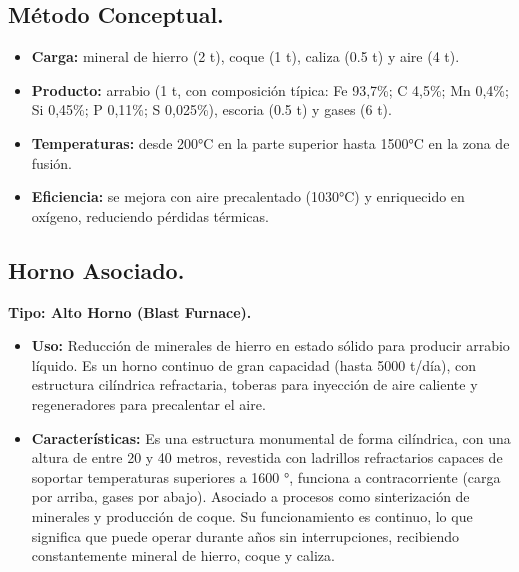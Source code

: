 \documentclass[12pt,a4paper]{article}
\begin{document}
\subsection{Método Conceptual.}

\begin{itemize}
    \item \textbf{Carga:} mineral de hierro (2 t), coque (1 t), caliza (0.5 t) y aire (4 t).
    \item \textbf{Producto:} arrabio (1 t, con composición típica: Fe 93,7\%; C 4,5\%; Mn 0,4\%; Si 0,45\%; P 0,11\%; S 0,025\%), escoria (0.5 t) y gases (6 t).
    \item \textbf{Temperaturas:} desde 200°C en la parte superior hasta 1500°C en la zona de fusión.
    \item \textbf{Eficiencia:} se mejora con aire precalentado (1030°C) y enriquecido en oxígeno, reduciendo pérdidas térmicas.
\end{itemize}

\subsection{Horno Asociado.} \label{alto_horno}

\textbf{Tipo: Alto Horno (Blast Furnace).}

\begin{itemize}
    \item \textbf{Uso:} Reducción de minerales de hierro en estado sólido para producir arrabio líquido. Es un horno continuo de gran capacidad (hasta 5000 t/día), con estructura cilíndrica refractaria, toberas para inyección de aire caliente y regeneradores para precalentar el aire.
    \item \textbf{Características:} Es una estructura monumental de forma cilíndrica, con una altura de entre 20 y 40 metros, revestida con ladrillos refractarios capaces de soportar temperaturas superiores a 1600 °, funciona a contracorriente (carga por arriba, gases por abajo). Asociado a procesos como sinterización de minerales y producción de coque. Su funcionamiento es continuo, lo que significa que puede operar durante años sin interrupciones, recibiendo constantemente mineral de hierro, coque y caliza.
\end{itemize}
\end{document}
